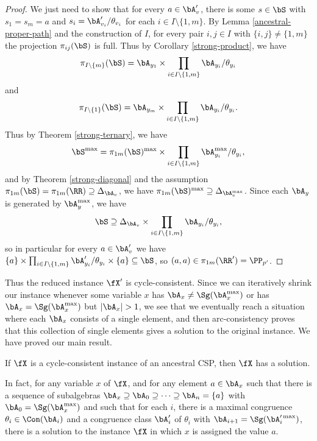 \begin{proof}
We just need to show that for every $a \in \bA_v'$, there is some $s \in \bS$ with $s_1 = s_m = a$ and $s_i = \bA_{v_i}'/\theta_{v_i}$ for each $i \in I \setminus\{1,m\}$. By Lemma \ref{ancestral-proper-path} and the construction of $I$, for every pair $i,j \in I$ with $\{i,j\} \ne \{1,m\}$ the projection $\pi_{ij}(\bS)$ is full. Thus by Corollary \ref{strong-product}, we have
\[
\pi_{I\setminus\{m\}}(\bS) = \bA_{y_1} \times \prod_{i \in I \setminus\{1,m\}} \bA_{y_i}/\theta_{y_i}
\]
and
\[
\pi_{I\setminus\{1\}}(\bS) = \bA_{y_m} \times \prod_{i \in I \setminus\{1,m\}} \bA_{y_i}/\theta_{y_i}.
\]
Thus by Theorem \ref{strong-ternary}, we have
\[
\bS^{\max} = \pi_{1m}(\bS)^{\max} \times \prod_{i \in I \setminus\{1,m\}} \bA_{y_i}^{\max}/\theta_{y_i},
\]
and by Theorem \ref{strong-diagonal} and the assumption $\pi_{1m}(\bS) = \pi_{1m}(\RR) \supseteq \Delta_{\bA_v}$, we have $\pi_{1m}(\bS)^{\max} \supseteq \Delta_{\bA_v^{\max}}$. Since each $\bA_y$ is generated by $\bA_y^{\max}$, we have
\[
\bS \supseteq \Delta_{\bA_v} \times \prod_{i \in I \setminus\{1,m\}} \bA_{y_i}/\theta_{y_i},
\]
so in particular for every $a \in \bA_v'$ we have $\{a\} \times \prod_{i \in I \setminus\{1,m\}} \bA_{y_i}'/\theta_{y_i} \times \{a\} \subseteq \bS$, so $(a,a) \in \pi_{1m}(\RR') = \PP_{p'}$.
\end{proof}

Thus the reduced instance $\fX'$ is cycle-consistent. Since we can iteratively shrink our instance whenever some variable $x$ has $\bA_x \ne \Sg(\bA_x^{\max})$ or has $\bA_x = \Sg(\bA_x^{\max})$ but $|\bA_x| > 1$, we see that we eventually reach a situation where each $\bA_x$ consists of a single element, and then arc-consistency proves that this collection of single elements gives a solution to the original instance. We have proved our main result.

\begin{thm} If $\fX$ is a cycle-consistent instance of an ancestral CSP, then $\fX$ has a solution.

In fact, for any variable $x$ of $\fX$, and for any element $a \in \bA_x$ such that there is a sequence of subalgebras $\bA_x \supseteq \bA_0 \supseteq \cdots \supseteq \bA_n = \{a\}$ with $\bA_0 = \Sg(\bA_x^{\max})$ and such that for each $i$, there is a maximal congruence $\theta_i \in \Con(\bA_i)$ and a congruence class $\bA_i'$ of $\theta_i$ with $\bA_{i+1} = \Sg(\bA_i'^{\max})$, there is a solution to the instance $\fX$ in which $x$ is assigned the value $a$.
\end{thm}

